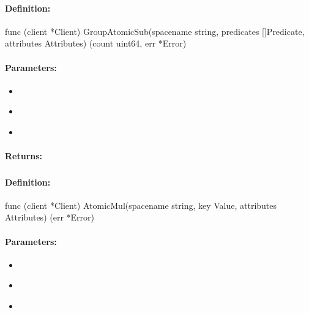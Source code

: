 \paragraph{Definition:}
\begin{gocode}
func (client *Client) GroupAtomicSub(spacename string, predicates []Predicate, attributes Attributes) (count uint64, err *Error)
\end{gocode}

\paragraph{Parameters:}
\begin{itemize}[noitemsep]
\item {}\\

\item {}\\

\item {}\\

\end{itemize}

\paragraph{Returns:}


\pagebreak
\subsubsection{}
\label{api:Go:AtomicMul}


\paragraph{Definition:}
\begin{gocode}
func (client *Client) AtomicMul(spacename string, key Value, attributes Attributes) (err *Error)
\end{gocode}

\paragraph{Parameters:}
\begin{itemize}[noitemsep]
\item {}\\

\item {}\\

\item {}\\

\end{itemize}

